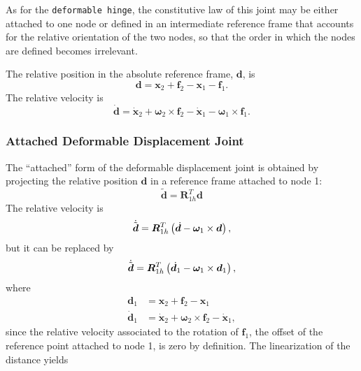 \documentclass[10pt,fleqn,subeqn]{report}
\newcommand{\T}[1]{\bm{#1}}
\begin{document}
As for the \texttt{deformable hinge}, the constitutive law of this joint
may be either attached to one node or defined in an intermediate
reference frame that accounts for the relative orientation of the two nodes,
so that the order in which the nodes are defined becomes irrelevant.

The relative position in the absolute reference frame, $\T{d}$, is
\begin{equation}
	\T{d} = \T{x}_2 + \T{f}_2 - \T{x}_1 - \T{f}_1 .
\end{equation}
The relative velocity is
\begin{equation}
	\dot{\T{d}} = \dot{\T{x}}_2 + \T{\omega}_2 \times \T{f}_2
		- \dot{\T{x}}_1 - \T{\omega}_1 \times \T{f}_1 .
\end{equation}

\subsubsection{Attached Deformable Displacement Joint}
The ``attached'' form of the deformable displacement joint
is obtained by projecting the relative position $\T{d}$
in a reference frame attached to node 1:
\begin{equation}
	\tilde{\T{d}} = \T{R}_{1h}^T \T{d}
\end{equation}
The relative velocity is
\begin{equation}
	\dot{\tilde{\T{d}}} = \T{R}_{1h}^T\plbr{
		\dot{\T{d}} - \T{\omega}_1 \times \T{d}
	} ,
\end{equation}
but it can be replaced by
\begin{equation}
	\dot{\tilde{\T{d}}} = \T{R}_{1h}^T\plbr{
		\dot{\T{d}}_1 - \T{\omega}_1 \times \T{d}_1
	} ,
\end{equation}
where
\begin{subequations}
\begin{align}
	\T{d}_1 &= \T{x}_2 + \T{f}_2 - \T{x}_1 \\
	\dot{\T{d}}_1 &= \dot{\T{x}}_2 + \T{\omega}_2 \times \T{f}_2 - \dot{\T{x}}_1 ,
\end{align}
\end{subequations}
since the relative velocity associated to the rotation of $\T{f}_1$,
the offset of the reference point attached to node 1,
is zero by definition.
The linearization of the distance yields
\end{document}
